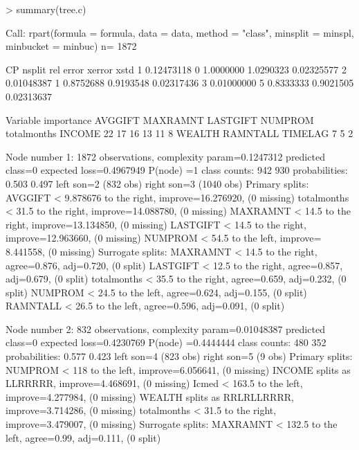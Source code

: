 \documentclass{article}
\begin{document}
\begin{Schunk}
\begin{Sinput}
> summary(tree.c)
\end{Sinput}
\begin{Soutput}
Call:
rpart(formula = formula, data = data, method = "class", minsplit = minspl, 
    minbucket = minbuc)
  n= 1872 

          CP nsplit rel error    xerror       xstd
1 0.12473118      0 1.0000000 1.0290323 0.02325577
2 0.01048387      1 0.8752688 0.9193548 0.02317436
3 0.01000000      5 0.8333333 0.9021505 0.02313637

Variable importance
    AVGGIFT    MAXRAMNT    LASTGIFT     NUMPROM totalmonths      INCOME 
         22          17          16          13          11           8 
     WEALTH    RAMNTALL     TIMELAG 
          7           5           2 

Node number 1: 1872 observations,    complexity param=0.1247312
  predicted class=0  expected loss=0.4967949  P(node) =1
    class counts:   942   930
   probabilities: 0.503 0.497 
  left son=2 (832 obs) right son=3 (1040 obs)
  Primary splits:
      AVGGIFT     < 9.878676 to the right, improve=16.276920, (0 missing)
      totalmonths < 31.5     to the right, improve=14.088780, (0 missing)
      MAXRAMNT    < 14.5     to the right, improve=13.134850, (0 missing)
      LASTGIFT    < 14.5     to the right, improve=12.963660, (0 missing)
      NUMPROM     < 54.5     to the left,  improve= 8.441558, (0 missing)
  Surrogate splits:
      MAXRAMNT    < 14.5     to the right, agree=0.876, adj=0.720, (0 split)
      LASTGIFT    < 12.5     to the right, agree=0.857, adj=0.679, (0 split)
      totalmonths < 35.5     to the right, agree=0.659, adj=0.232, (0 split)
      NUMPROM     < 24.5     to the left,  agree=0.624, adj=0.155, (0 split)
      RAMNTALL    < 26.5     to the left,  agree=0.596, adj=0.091, (0 split)

Node number 2: 832 observations,    complexity param=0.01048387
  predicted class=0  expected loss=0.4230769  P(node) =0.4444444
    class counts:   480   352
   probabilities: 0.577 0.423 
  left son=4 (823 obs) right son=5 (9 obs)
  Primary splits:
      NUMPROM     < 118      to the left,  improve=6.056641, (0 missing)
      INCOME      splits as  LLRRRRR,      improve=4.468691, (0 missing)
      Icmed       < 163.5    to the left,  improve=4.277984, (0 missing)
      WEALTH      splits as  RRLRLLRRRR,   improve=3.714286, (0 missing)
      totalmonths < 31.5     to the right, improve=3.479007, (0 missing)
  Surrogate splits:
      MAXRAMNT < 132.5    to the left,  agree=0.99, adj=0.111, (0 split)


\end{Soutput}
\end{Schunk}
\end{document}
